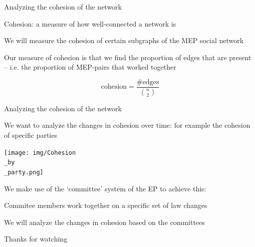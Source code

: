 \documentclass{beamer}
\begin{document}
\begin{frame}{Analyzing the cohesion of the network}
	
	Cohesion: a measure of how well-connected a network is
	
	\vspace{2mm}
	
	\pause We will measure the cohesion of certain subgraphs of the MEP social network
	
	\vspace{2mm}
	
	\pause Our measure of cohesion is that we find the proportion of edges that are present -- i.e. the proportion of MEP-pairs that worked together
	
	\pause \[
		\text{cohesion} = \frac{\#\text{edges}}{\binom{n}{2}}
	\]
	
\end{frame}

\begin{frame}{Analyzing the cohesion of the network}
	
	
	
	\pause We want to analyze the changes in cohesion over time: for example the cohesion of specific parties
	
	\pause \begin{center}
		\texttt{[image: img/Cohesion\\\_by\\\_party.png]}
	\end{center}
	
	\vspace{2mm}
	
	\pause We make use of the `committee' system of the EP to achieve this:
	
	\vspace{2mm}
	
	\pause Commitee members work together on a specific set of law changes
	
	\vspace{2mm}
	
	\pause We will analyze the changes in cohesion based on the committees
	
\end{frame}

\begin{frame}{}
	
	\centering Thanks for watching
	
	
\end{frame}
\end{document}
